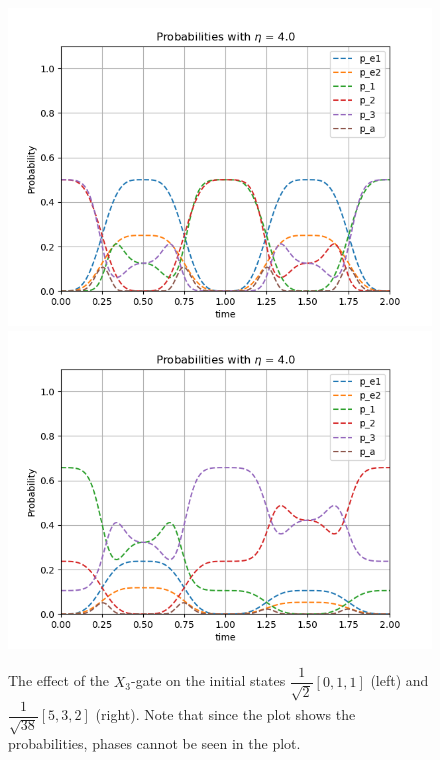 \begin{figure}[H]
\includegraphics[scale=0.5]{figures/pop_plot_X011.png}
\includegraphics[scale=0.5]{figures/pop_plot_X532.png}
\caption{The effect of the $X_3$-gate on the initial states $\dfrac{1}{\sqrt{2}}[0,1,1]$ (left) and $\dfrac{1}{\sqrt{38}}[5,3,2]$ (right). Note that since the plot shows the probabilities, phases cannot be seen in the plot.}
\label{fig:pop_X}
\end{figure}

